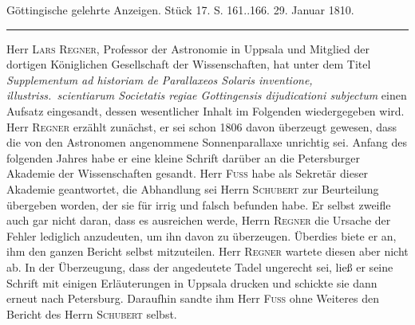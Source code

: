 \clearpage
{}
\begin{center}\small Göttingische gelehrte Anzeigen. Stück 17. S. 161..166. 29. Januar 1810.\\[3pt]\rule{.72\linewidth}{.3pt}\end{center}

Herr \textsc{Lars Regner}, Professor der Astronomie in Uppsala und Mitglied der dortigen Königlichen Gesellschaft der Wissenschaften, hat unter dem Titel \emph{Supplementum ad historiam de Parallaxeos Solaris inventione, illustriss.\ scientiarum Societatis regiae Gottingensis dijudicationi subjectum} einen Aufsatz eingesandt, dessen wesentlicher Inhalt im Folgenden wiedergegeben wird. Herr \textsc{Regner} erzählt zunächst, er sei schon 1806 davon überzeugt gewesen, dass die von den Astronomen angenommene Sonnenparallaxe unrichtig sei. Anfang des folgenden Jahres habe er eine kleine Schrift darüber an die Petersburger Akademie der Wissenschaften gesandt. Herr \textsc{Fuss} habe als Sekretär dieser Akademie geantwortet, die Abhandlung sei Herrn \textsc{Schubert} zur Beurteilung übergeben worden, der sie für irrig und falsch befunden habe. Er selbst zweifle auch gar nicht daran, dass es ausreichen werde, Herrn \textsc{Regner} die Ursache der Fehler lediglich anzudeuten, um ihn davon zu überzeugen. Überdies biete er an, ihm den ganzen Bericht selbst mitzuteilen. Herr \textsc{Regner} wartete diesen aber nicht ab. In der Überzeugung, dass der angedeutete Tadel ungerecht sei, ließ er seine Schrift mit einigen Erläuterungen in Uppsala drucken und schickte sie dann erneut nach Petersburg. Daraufhin sandte ihm Herr \textsc{Fuss} ohne Weiteres den Bericht des Herrn \textsc{Schubert} selbst.

